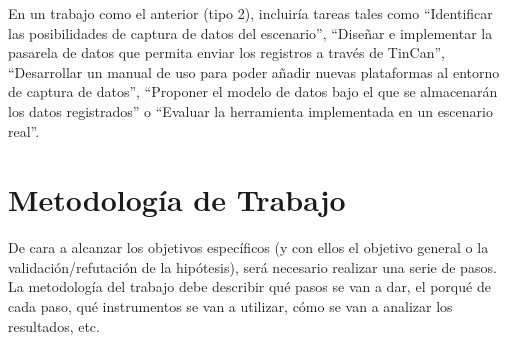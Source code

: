 En un trabajo como el anterior (tipo 2), incluiría tareas tales como ``Identificar las posibilidades de captura de datos del escenario'', ``Diseñar e implementar la pasarela de datos que permita enviar los registros a través de TinCan'', ``Desarrollar un manual de uso para poder añadir nuevas plataformas al entorno de captura de datos'', ``Proponer el modelo de datos bajo el que se almacenarán los datos registrados'' o ``Evaluar la herramienta implementada en un escenario real''.

\section{Metodología de Trabajo}\label{sec:metodología}

De cara a alcanzar los objetivos específicos (y con ellos el objetivo general o la
validación/refutación de la hipótesis), será necesario realizar una serie de pasos. La metodología del trabajo debe describir qué pasos se van a dar, el porqué de cada paso, qué instrumentos se van a utilizar, cómo se van a analizar los resultados, etc.